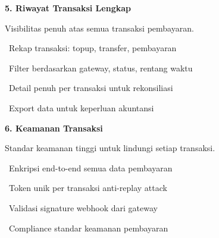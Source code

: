 \documentclass[a4paper]{article}
\begin{document}
\vspace{8pt}

\noindent
\begin{minipage}[t]{0.485\textwidth}
    \colorbox{OrangePrimary}{%
        \begin{minipage}{\dimexpr\textwidth-14pt}
            \vspace{5pt}
            {\fontsize{10}{13}\selectfont\bfseries\color{White} 5. Riwayat Transaksi Lengkap}
            \vspace{5pt}
        \end{minipage}}
    \vspace{5pt}
    {\fontsize{9}{12}\selectfont\color{TextDark}%
    Visibilitas penuh atas semua transaksi pembayaran.\par\vspace{3pt}
    \textbullet\ Rekap transaksi: topup, transfer, pembayaran\par\vspace{2pt}%
    \textbullet\ Filter berdasarkan gateway, status, rentang waktu\par\vspace{2pt}%
    \textbullet\ Detail penuh per transaksi untuk rekonsiliasi\par\vspace{2pt}%
    \textbullet\ Export data untuk keperluan akuntansi}%
\end{minipage}%
\hfill
\begin{minipage}[t]{0.485\textwidth}
    \colorbox{GreenDark}{%
        \begin{minipage}{\dimexpr\textwidth-14pt}
            \vspace{5pt}
            {\fontsize{10}{13}\selectfont\bfseries\color{White} 6. Keamanan Transaksi}
            \vspace{5pt}
        \end{minipage}}
    \vspace{5pt}
    {\fontsize{9}{12}\selectfont\color{TextDark}%
    Standar keamanan tinggi untuk lindungi setiap transaksi.\par\vspace{3pt}
    \textbullet\ Enkripsi end-to-end semua data pembayaran\par\vspace{2pt}%
    \textbullet\ Token unik per transaksi anti-replay attack\par\vspace{2pt}%
    \textbullet\ Validasi signature webhook dari gateway\par\vspace{2pt}%
    \textbullet\ Compliance standar keamanan pembayaran}%
\end{minipage}
\end{document}
